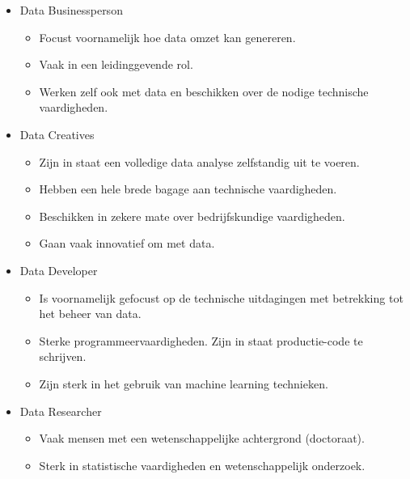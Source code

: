 \documentclass[]{tufte-book}
\providecommand{\tightlist}{%
  \setlength{\itemsep}{0pt}\setlength{\parskip}{0pt}}
\begin{document}
\begin{itemize}
  \begin{itemize}
  \tightlist
  \item
    Data Businessperson

    \begin{itemize}
    \tightlist
    \item
      Focust voornamelijk hoe data omzet kan genereren.
    \item
      Vaak in een leidinggevende rol.
    \item
      Werken zelf ook met data en beschikken over de nodige technische vaardigheden.
    \end{itemize}
  \item
    Data Creatives

    \begin{itemize}
    \tightlist
    \item
      Zijn in staat een volledige data analyse zelfstandig uit te voeren.
    \item
      Hebben een hele brede bagage aan technische vaardigheden.
    \item
      Beschikken in zekere mate over bedrijfskundige vaardigheden.
    \item
      Gaan vaak innovatief om met data.
    \end{itemize}
  \item
    Data Developer

    \begin{itemize}
    \tightlist
    \item
      Is voornamelijk gefocust op de technische uitdagingen met betrekking tot het beheer van data.
    \item
      Sterke programmeervaardigheden. Zijn in staat productie-code te schrijven.
    \item
      Zijn sterk in het gebruik van machine learning technieken.
    \end{itemize}
  \item
    Data Researcher

    \begin{itemize}
    \tightlist
    \item
      Vaak mensen met een wetenschappelijke achtergrond (doctoraat).
    \item
      Sterk in statistische vaardigheden en wetenschappelijk onderzoek.
    \end{itemize}
  \end{itemize}
\end{itemize}
\end{document}
